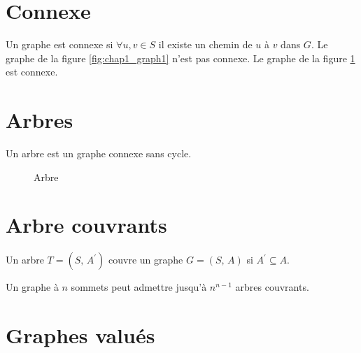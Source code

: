 \section{Connexe}
\begin{definition}[Connexe]
Un graphe est connexe si $\forall u, v \in S$ il existe un chemin de $u$ à $v$ dans $G$. Le graphe de la figure \ref{fig:chap1_graph1} n'est pas connexe. Le graphe de la figure \ref{fig:chap1_arbr1} est connexe.
\end{definition}

\section{Arbres}
\begin{definition}[Arbre]
Un arbre est un graphe connexe sans cycle.
\end{definition}

\begin{figure}[h]
	\centering
	\caption{Arbre}
	\label{fig:chap1_arbr1}
\end{figure}

\section{Arbre couvrants}

\begin{definition}
Un arbre $T = (S,\, A^{\prime})$ couvre un graphe $G = (S,\, A)$ si $A^{\prime} \subseteq A$.
\end{definition}

Un graphe à $n$ sommets peut admettre jusqu'à $n^{n-1}$ arbres couvrants.

\section{Graphes valués}

